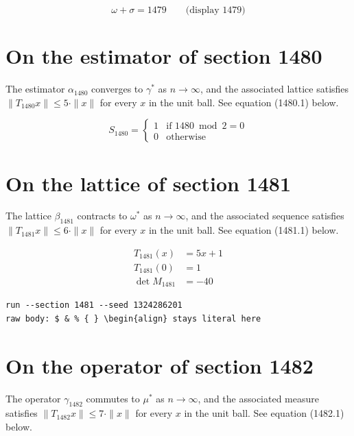 \documentclass{article}
\begin{document}
$$
\omega + \sigma = 1479 \qquad \text{(display 1479)}
$$

\section{On the estimator of section 1480}
The estimator $\alpha_{1480}$ converges to $\gamma^{*}$ as $n \to \infty$,
and the associated lattice satisfies $\|T_{1480} x\| \leq 5 \cdot \|x\|$
for every $x$ in the unit ball. See equation (1480.1) below.

\begin{equation}
S_{1480} = \begin{cases} 1 & \text{if } 1480 \bmod 2 = 0 \\ 0 & \text{otherwise} \end{cases}
\end{equation}

\section{On the lattice of section 1481}
The lattice $\beta_{1481}$ contracts to $\omega^{*}$ as $n \to \infty$,
and the associated sequence satisfies $\|T_{1481} x\| \leq 6 \cdot \|x\|$
for every $x$ in the unit ball. See equation (1481.1) below.

\begin{align}
T_{1481}(x) &= 5 x + 1 \\
T_{1481}(0) &= 1 \\
\det M_{1481} &= -40
\end{align}

\begin{verbatim}
run --section 1481 --seed 1324286201
raw body: $ & % { } \begin{align} stays literal here
\end{verbatim}

\section{On the operator of section 1482}
The operator $\gamma_{1482}$ commutes to $\mu^{*}$ as $n \to \infty$,
and the associated measure satisfies $\|T_{1482} x\| \leq 7 \cdot \|x\|$
for every $x$ in the unit ball. See equation (1482.1) below.
\end{document}
